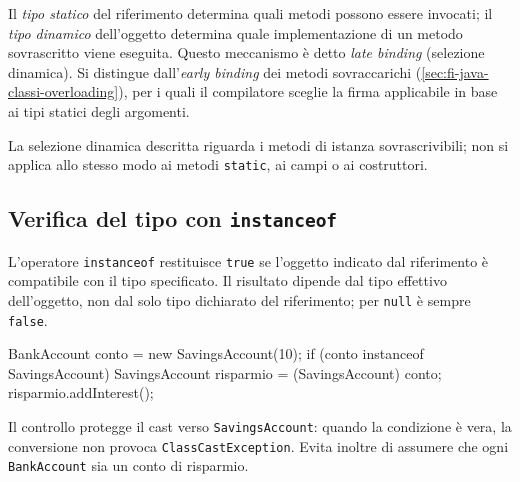 Il \emph{tipo statico} del riferimento determina quali metodi
possono essere invocati; il \emph{tipo dinamico} dell'oggetto
determina quale implementazione di un metodo sovrascritto viene
eseguita. Questo meccanismo è detto \emph{late binding}
(selezione dinamica). Si distingue dall'\emph{early binding}
dei metodi sovraccarichi
(\cref{sec:fi-java-classi-overloading}), per i quali il compilatore
sceglie la firma applicabile in base ai tipi statici degli argomenti.

La selezione dinamica descritta riguarda i metodi di istanza
sovrascrivibili; non si applica allo stesso modo ai metodi
\texttt{static}, ai campi o ai costruttori.

\subsection{Verifica del tipo con \texttt{instanceof}}
\label{sec:fi-java-ereditarieta-instanceof}

L'operatore \texttt{instanceof} restituisce \texttt{true} se
l'oggetto indicato dal riferimento è compatibile con il tipo
specificato. Il risultato dipende dal tipo effettivo dell'oggetto,
non dal solo tipo dichiarato del riferimento; per \texttt{null}
è sempre \texttt{false}.

\begin{unipdcode}[language=Java]
BankAccount conto = new SavingsAccount(10);
if (conto instanceof SavingsAccount) {
    SavingsAccount risparmio = (SavingsAccount) conto;
    risparmio.addInterest();
}
\end{unipdcode}

Il controllo protegge il cast verso \texttt{SavingsAccount}:
quando la condizione è vera, la conversione non provoca
\texttt{ClassCastException}. Evita inoltre di assumere che ogni
\texttt{BankAccount} sia un conto di risparmio.
